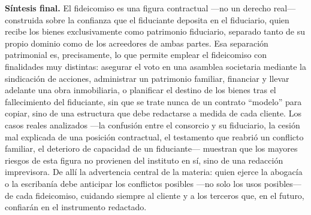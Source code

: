 \documentclass[12pt,oneside]{book}
\begin{document}
\begin{important}
\textbf{Síntesis final.} El fideicomiso es una figura contractual —no un derecho real— construida sobre la confianza que el fiduciante deposita en el fiduciario, quien recibe los bienes exclusivamente como patrimonio fiduciario, separado tanto de su propio dominio como de los acreedores de ambas partes. Esa separación patrimonial es, precisamente, lo que permite emplear el fideicomiso con finalidades muy distintas: asegurar el voto en una asamblea societaria mediante la sindicación de acciones, administrar un patrimonio familiar, financiar y llevar adelante una obra inmobiliaria, o planificar el destino de los bienes tras el fallecimiento del fiduciante, sin que se trate nunca de un contrato ``modelo'' para copiar, sino de una estructura que debe redactarse a medida de cada cliente. Los casos reales analizados —la confusión entre el consorcio y su fiduciario, la cesión mal explicada de una posición contractual, el testamento que reabrió un conflicto familiar, el deterioro de capacidad de un fiduciante— muestran que los mayores riesgos de esta figura no provienen del instituto en sí, sino de una redacción imprevisora. De allí la advertencia central de la materia: quien ejerce la abogacía o la escribanía debe anticipar los conflictos posibles —no solo los usos posibles— de cada fideicomiso, cuidando siempre al cliente y a los terceros que, en el futuro, confiarán en el instrumento redactado.
\end{important}
\end{document}
